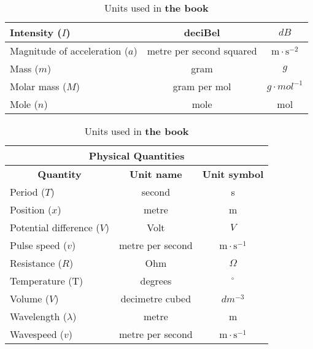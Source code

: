 \begin{table}[H]
\begin{center}
\begin{tabular}{|l|c|c|}
Intensity ($I$)            & deciBel &   $dB$                         \\ \hline
Magnitude of acceleration ($a$)   & metre per second squared & $\text{m} \cdot \text{s}^{-2}$  \\ \hline
Mass ($m$)             & gram & $g$\\ \hline
Molar mass ($M$)             & gram per mol & $g \cdot mol^{-1}$              \\ \hline
Mole ($n$)             & mole & mol     \\ \hline
\end{tabular}
\end{center}
\caption{Units used in \textbf{the book} }
\label{table:book::units1}
\end{table}
\begin{table}[H]
\begin{center}
\begin{tabular}{|l|c|c|}\hline \hline 
\multicolumn{3}{|c|}{\textbf{Physical Quantities}}\\ \hline \hline
\multicolumn{1}{|c|}{\textbf{Quantity}} & \textbf{Unit name} & \textbf{Unit symbol}\\ \hline
Period ($T$)             & second &  s                               \\ \hline
Position ($x$)             & metre & m                               \\ \hline 
Potential difference ($V$)            & Volt & $V$   \\ \hline
Pulse speed ($v$)             & metre per second & $\text{m} \cdot \text{s}^{-1}$ \\ \hline
Resistance  ($R$)             & Ohm & $\Omega$ \\ \hline 
Temperature (T)               & degrees & $^{\circ}$ \\ \hline
Volume ($V$)             & decimetre cubed & $dm^{-3}$  \\ \hline
Wavelength ($\lambda$)       & metre & m                                \\ \hline
Wavespeed ($v$)             & metre per second & $\text{m} \cdot \text{s}^{-1}$ \\ \hline
\end{tabular}
\end{center}
\caption{Units used in \textbf{the book} }
\label{table:book::units2}
\end{table}
